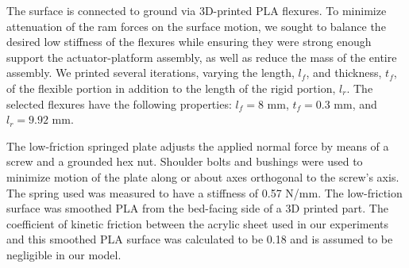 %
The surface is connected to ground via 3D-printed PLA flexures.
%
To minimize attenuation of the ram forces on the surface motion, we sought to balance the desired low stiffness of the flexures while ensuring they were strong enough support the actuator-platform assembly, as well as reduce the mass of the entire assembly.
%
We printed several iterations, varying the length, $l_f$, and thickness, $t_f$, of the flexible portion in addition to the length of the rigid portion, $l_r$.
% 
The selected flexures have the following properties: $l_f = 8 \text{ mm}$, $t_f = 0.3 \text{ mm}$, and $l_r = 9.92 \text{ mm}$.

The low-friction springed plate adjusts the applied normal force by means of a screw and a grounded hex nut. 
%
Shoulder bolts and bushings were used to minimize motion of the plate along or about axes orthogonal to the screw's axis. 
%
The spring used was measured to have a stiffness of 0.57 N/mm.
%
The low-friction surface was smoothed PLA from the bed-facing side of a 3D printed part. 
%
The coefficient of kinetic friction between the acrylic sheet used in our experiments and this smoothed PLA surface was calculated to be 0.18 and is assumed to be negligible in our model.

